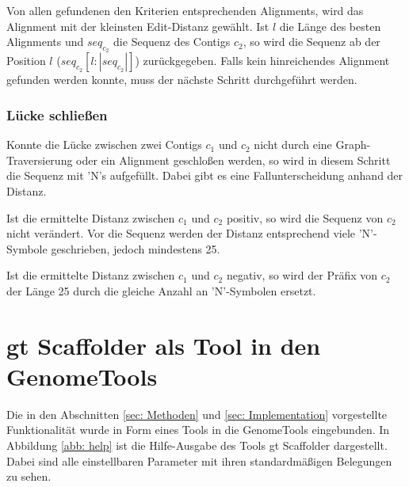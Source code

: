 \documentclass[a4paper,10pt,parskip]{scrartcl}
\begin{document}
Von allen gefundenen den Kriterien entsprechenden Alignments, wird das
Alignment mit der kleinsten Edit-Distanz gewählt. Ist $l$ die Länge
des besten Alignments und $seq_{c_2}$ die Sequenz des Contigs $c_2$,
so wird die Sequenz ab der Position $l$ ($seq_{c_2}[l:|seq_{c_2}|]$)
zurückgegeben. Falls kein hinreichendes Alignment gefunden werden
konnte, muss der nächste Schritt durchgeführt werden.

\subsubsection{Lücke schließen}
Konnte die Lücke zwischen zwei Contigs $c_1$ und $c_2$ nicht durch
eine Graph-Traversierung oder ein Alignment geschloßen werden, so wird
in diesem Schritt die Sequenz mit 'N's aufgefüllt. Dabei gibt es eine
Fallunterscheidung anhand der Distanz.

Ist die ermittelte Distanz zwischen $c_1$ und $c_2$ positiv, so wird
die Sequenz von $c_2$ nicht verändert. Vor die Sequenz werden der
Distanz entsprechend viele 'N'-Symbole geschrieben, jedoch mindestens
25.

Ist die ermittelte Distanz zwischen $c_1$ und $c_2$ negativ, so wird
der Präfix von $c_2$ der Länge 25 durch die gleiche Anzahl an
'N'-Symbolen ersetzt.

\section{gt Scaffolder als Tool in den GenomeTools}
Die in den Abschnitten \ref{sec: Methoden} und \ref{sec:
  Implementation} vorgestellte Funktionalität wurde in Form eines
Tools in die GenomeTools eingebunden. In Abbildung \ref{abb: help} ist
die Hilfe-Ausgabe des Tools gt Scaffolder dargestellt. Dabei sind alle
einstellbaren Parameter mit ihren standardmäßigen Belegungen zu sehen.
\end{document}

